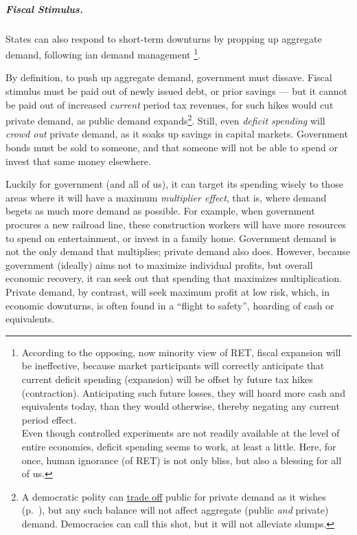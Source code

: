 \subparagraph{Fiscal Stimulus.}  \label{sec:fiscal-stimulus}
States can also respond to short-term downturns by propping up aggregate demand, following \citeauthor{Keynes1936}ian demand management \footnote{
	According to the opposing, now minority view of \gls{RET}, fiscal expansion will be ineffective, because market participants will correctly anticipate that current deficit spending (expansion) will be offset by future tax hikes (contraction). Anticipating such future losses, they will hoard more cash and equivalents today, than they would otherwise, thereby negating any current period effect.\\ Even though controlled experiments are not readily available at the level of entire economies, deficit spending seems to work, at least a little. Here, for once, human ignorance (of \gls{RET}) is not only bliss, but also a blessing for all of us.}.

By definition, to push up aggregate demand, government must dissave. Fiscal stimulus must be paid out of newly issued debt, or prior savings --- but it cannot be paid out of increased \emph{current} period tax revenues, for such hikes would cut private demand, as public demand expands\footnote{
	A democratic polity can \hyperref[sec:tradeoffs]{trade off} public for private demand as it wishes (p.~\pageref{sec:tradeoffs}), but any such balance will not affect aggregate (public \emph{and} private) demand. Democracies can call this shot, but it will not alleviate slumps.}.
Still, even \emph{deficit spending} will \emph{crowd out} private demand, as it soaks up savings in capital markets. Government bonds must be sold to someone, and that someone will not be able to spend or invest that same money elsewhere.

Luckily for government (and all of us), it can target its spending wisely to those areas where it will have a maximum \emph{multiplier effect}, that is, where demand begets as much more demand as possible. For example, when government procures a new railroad line, these construction workers will have more resources to spend on entertainment, or invest in a family home. Government demand is not the only demand that multiplies; private demand also does. However, because government (ideally) aims not to maximize individual profits, but overall economic recovery, it can seek out that spending that maximizes multiplication. Private demand, by contrast, will seek maximum profit at low risk, which, in economic downturns, is often found in a ``flight to safety'', hoarding of cash or equivalents.


